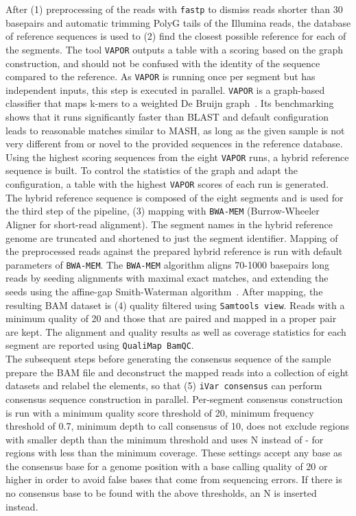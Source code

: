 After (1) preprocessing of the reads with \texttt{fastp} to dismiss reads shorter than 30 basepairs and automatic trimming PolyG tails of the Illumina reads, the database of reference sequences is used to (2) find the closest possible reference for each of the segments. The tool \texttt{VAPOR} outputs a table with a scoring based on the graph construction, and should not be confused with the identity of the sequence compared to the reference. As \texttt{VAPOR} is running once per segment but has independent inputs, this step is executed in parallel. \texttt{VAPOR} is a graph-based classifier that maps k-mers to a weighted De Bruijn graph~\cite{southgate2020influenza}. Its benchmarking shows that it runs significantly faster than BLAST and default configuration leads to reasonable matches similar to MASH, as long as the given sample is not very different from or novel to the provided sequences in the reference database. \\
Using the highest scoring sequences from the eight \texttt{VAPOR} runs, a hybrid reference sequence is built. To control the statistics of the graph and adapt the configuration, a table with the highest \texttt{VAPOR} scores of each run is generated. \\
The hybrid reference sequence is composed of the eight segments and is used for the third step of the pipeline, (3) mapping with \texttt{BWA-MEM} (Burrow-Wheeler Aligner for short-read alignment). The segment names in the hybrid reference genome are truncated and shortened to just the segment identifier. Mapping of the preprocessed reads against the prepared hybrid reference is run with default parameters of \texttt{BWA-MEM}. The \texttt{BWA-MEM} algorithm aligns 70-1000 basepairs long reads by seeding alignments with maximal exact matches, and extending the seeds using the affine-gap Smith-Waterman algorithm~\cite{li2013aligning}. After mapping, the resulting BAM dataset is (4) quality filtered using \texttt{Samtools view}. Reads with a minimum quality of 20 and those that are paired and mapped in a proper pair are kept. The alignment and quality results as well as coverage statistics for each segment are reported using \texttt{QualiMap BamQC}. \\
The subsequent steps before generating the consensus sequence of the sample prepare the BAM file and deconstruct the mapped reads into a collection of eight datasets and relabel the elements, so that (5) \texttt{iVar consensus} can perform consensus sequence construction in parallel. 
Per-segment consensus construction is run with a minimum quality score threshold of 20, minimum frequency threshold of 0.7, minimum depth to call consensus of 10, does not exclude regions with smaller depth than the minimum threshold and uses N instead of - for regions with less than the minimum coverage. These settings accept any base as the consensus base for a genome position with a base calling quality of 20 or higher in order to avoid false bases that come from sequencing errors. If there is no consensus base to be found with the above thresholds, an N is inserted instead. \\

